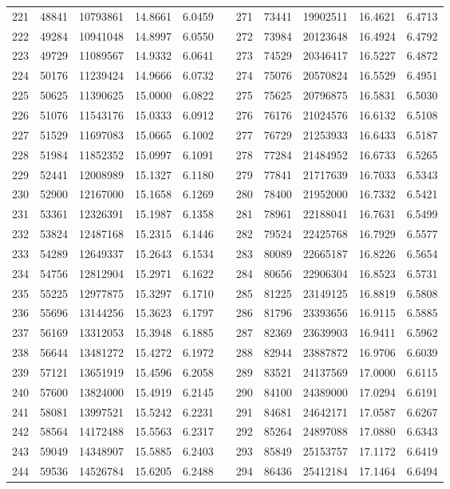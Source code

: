 \begin{longtable}{rrrrrrrrrrr}
221&48841&10793861&14.8661&6.0459&&271&73441&19902511&16.4621&6.4713\\
222&49284&10941048&14.8997&6.0550&&272&73984&20123648&16.4924&6.4792\\
223&49729&11089567&14.9332&6.0641&&273&74529&20346417&16.5227&6.4872\\
224&50176&11239424&14.9666&6.0732&&274&75076&20570824&16.5529&6.4951\\
225&50625&11390625&15.0000&6.0822&&275&75625&20796875&16.5831&6.5030\\
226&51076&11543176&15.0333&6.0912&&276&76176&21024576&16.6132&6.5108\\
227&51529&11697083&15.0665&6.1002&&277&76729&21253933&16.6433&6.5187\\
228&51984&11852352&15.0997&6.1091&&278&77284&21484952&16.6733&6.5265\\
229&52441&12008989&15.1327&6.1180&&279&77841&21717639&16.7033&6.5343\\
230&52900&12167000&15.1658&6.1269&&280&78400&21952000&16.7332&6.5421\\
231&53361&12326391&15.1987&6.1358&&281&78961&22188041&16.7631&6.5499\\
232&53824&12487168&15.2315&6.1446&&282&79524&22425768&16.7929&6.5577\\
233&54289&12649337&15.2643&6.1534&&283&80089&22665187&16.8226&6.5654\\
234&54756&12812904&15.2971&6.1622&&284&80656&22906304&16.8523&6.5731\\
235&55225&12977875&15.3297&6.1710&&285&81225&23149125&16.8819&6.5808\\
236&55696&13144256&15.3623&6.1797&&286&81796&23393656&16.9115&6.5885\\
237&56169&13312053&15.3948&6.1885&&287&82369&23639903&16.9411&6.5962\\
238&56644&13481272&15.4272&6.1972&&288&82944&23887872&16.9706&6.6039\\
239&57121&13651919&15.4596&6.2058&&289&83521&24137569&17.0000&6.6115\\
240&57600&13824000&15.4919&6.2145&&290&84100&24389000&17.0294&6.6191\\
241&58081&13997521&15.5242&6.2231&&291&84681&24642171&17.0587&6.6267\\
242&58564&14172488&15.5563&6.2317&&292&85264&24897088&17.0880&6.6343\\
243&59049&14348907&15.5885&6.2403&&293&85849&25153757&17.1172&6.6419\\
244&59536&14526784&15.6205&6.2488&&294&86436&25412184&17.1464&6.6494\\

\end{longtable}
